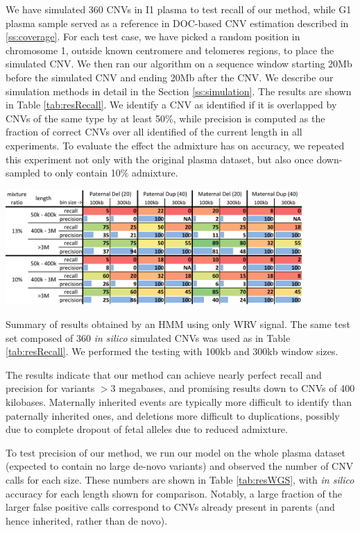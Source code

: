 We have simulated 360 CNVs in I1 plasma to test recall of our method, while G1 plasma sample served as a reference in DOC-based CNV estimation described in \ref{ss:coverage}. For each test case, we have picked a random position in chromosome 1, outside known centromere and telomeres regions, to place the simulated CNV.  We then ran our algorithm on a sequence window starting 20Mb before the simulated CNV and ending 20Mb after the CNV.  We describe our simulation methods in detail in the Section \ref{ss:simulation}. The results are shown in Table \ref{tab:resRecall}. We identify a CNV as identified if it is overlapped by CNVs of the same type by at least 50\%, while precision is computed as the fraction of correct CNVs over all identified of the current length in all experiments. To evaluate the effect the admixture has on accuracy, we repeated this experiment not only with the original plasma dataset, but also once down-sampled to only contain 10\% admixture. 

\begin{table}[t]
\centering
\includegraphics[width=0.85\textwidth]{figures/ismb_wrv_res_color}
\caption{Summary of results obtained by an HMM using only WRV signal. The same test set composed of 360 \emph{in silico} simulated CNVs was used as in Table \ref{tab:resRecall}. We performed the testing with 100kb and 300kb window sizes.}
\label{tab:resWRV} 
\end{table}

The results indicate that our method can achieve nearly perfect recall and precision for variants $>3$ megabases, and promising results down to CNVs of 400 kilobases.  Maternally inherited events are typically more difficult to identify than paternally inherited ones, and deletions more difficult to duplications, possibly due to complete dropout of fetal alleles due to reduced admixture.

To test precision of our method, we run our model on the whole plasma dataset (expected to contain no large de-novo variants) and observed the number of CNV calls for each size. These numbers are shown in Table \ref{tab:resWGS}, with \textit{in silico} accuracy for each length shown for comparison. Notably, a large fraction of the larger false positive calls correspond to CNVs already present in parents (and hence inherited, rather than de novo). 

